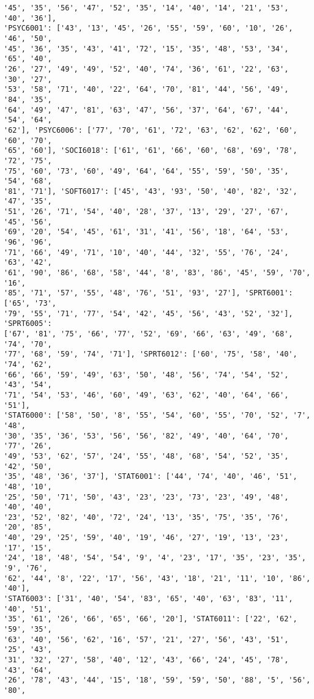 \documentclass[11pt]{article}
\begin{document}
\begin{Verbatim}[commandchars=\\\{\}]
'45', '35', '56', '47', '52', '35', '14', '40', '14', '21', '53', '40', '36'],
'PSYC6001': ['43', '13', '45', '26', '55', '59', '60', '10', '26', '46', '50',
'45', '36', '35', '43', '41', '72', '15', '35', '48', '53', '34', '65', '40',
'26', '27', '49', '49', '52', '40', '74', '36', '61', '22', '63', '30', '27',
'53', '58', '71', '40', '22', '64', '70', '81', '44', '56', '49', '84', '35',
'64', '49', '47', '81', '63', '47', '56', '37', '64', '67', '44', '54', '64',
'62'], 'PSYC6006': ['77', '70', '61', '72', '63', '62', '62', '60', '60', '70',
'65', '60'], 'SOCI6018': ['61', '61', '66', '60', '68', '69', '78', '72', '75',
'75', '60', '73', '60', '49', '64', '64', '55', '59', '50', '35', '54', '68',
'81', '71'], 'SOFT6017': ['45', '43', '93', '50', '40', '82', '32', '47', '35',
'51', '26', '71', '54', '40', '28', '37', '13', '29', '27', '67', '45', '56',
'69', '20', '54', '45', '61', '31', '41', '56', '18', '64', '53', '96', '96',
'71', '66', '49', '71', '10', '40', '44', '32', '55', '76', '24', '63', '42',
'61', '90', '86', '68', '58', '44', '8', '83', '86', '45', '59', '70', '16',
'85', '71', '57', '55', '48', '76', '51', '93', '27'], 'SPRT6001': ['65', '73',
'79', '55', '71', '77', '54', '42', '45', '56', '43', '52', '32'], 'SPRT6005':
['67', '81', '75', '66', '77', '52', '69', '66', '63', '49', '68', '74', '70',
'77', '68', '59', '74', '71'], 'SPRT6012': ['60', '75', '58', '40', '74', '62',
'66', '66', '59', '49', '63', '50', '48', '56', '74', '54', '52', '43', '54',
'71', '54', '53', '46', '60', '49', '63', '62', '40', '64', '66', '51'],
'STAT6000': ['58', '50', '8', '55', '54', '60', '55', '70', '52', '7', '48',
'30', '35', '36', '53', '56', '56', '82', '49', '40', '64', '70', '77', '26',
'49', '53', '62', '57', '24', '55', '48', '68', '54', '52', '35', '42', '50',
'35', '48', '36', '37'], 'STAT6001': ['44', '74', '40', '46', '51', '48', '10',
'25', '50', '71', '50', '43', '23', '23', '73', '23', '49', '48', '40', '40',
'23', '52', '82', '40', '72', '24', '13', '35', '75', '35', '76', '20', '85',
'40', '29', '25', '59', '40', '19', '46', '27', '19', '13', '23', '17', '15',
'24', '18', '48', '54', '54', '9', '4', '23', '17', '35', '23', '35', '9', '76',
'62', '44', '8', '22', '17', '56', '43', '18', '21', '11', '10', '86', '40'],
'STAT6003': ['31', '40', '54', '83', '65', '40', '63', '83', '11', '40', '51',
'35', '61', '26', '66', '65', '66', '20'], 'STAT6011': ['22', '62', '59', '35',
'63', '40', '56', '62', '16', '57', '21', '27', '56', '43', '51', '25', '43',
'31', '32', '27', '58', '40', '12', '43', '66', '24', '45', '78', '43', '64',
'26', '78', '43', '44', '15', '18', '59', '59', '50', '88', '5', '56', '80',

\end{Verbatim}
\end{document}
